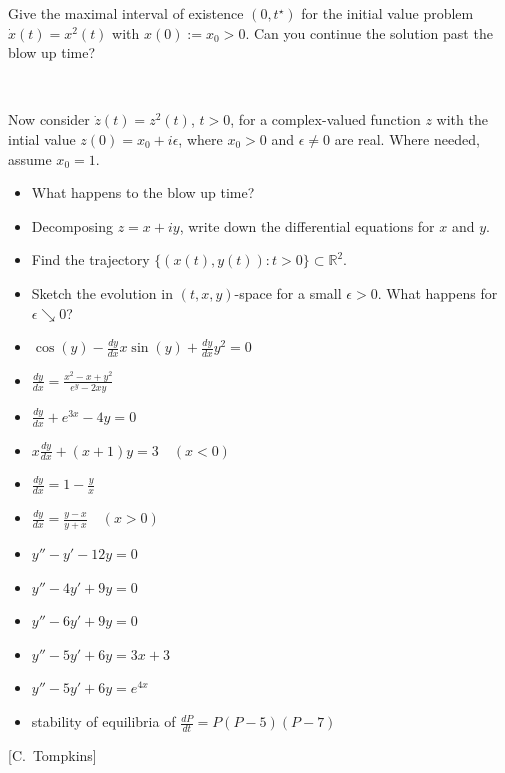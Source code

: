 \documentclass[onepage, 12pt]{beamer}
\begin{document}
\begin{frame}{}{}
    Give the maximal interval of existence $(0, t^\star)$
    for the initial value problem
    $\dot{x}(t) = x^2(t)$
    with
    $x(0) := x_0 > 0$.
    Can you continue the solution past the blow up time?

    {\ }
    
    \pause
    
    Now consider 
    $\dot{z}(t) = z^2(t)$, $t > 0$,
    for a complex-valued function $z$
    with the intial value
    $z(0) = x_0 + i \epsilon$,
    where $x_0 > 0$ and $\epsilon \neq 0$ are real.
    Where needed, assume $x_0 = 1$.

    \begin{itemize}
    \item 
        What happens to the blow up time?
    \item
        Decomposing $z = x + i y$,
        write down the differential equations for $x$ and $y$.
    \item
        Find the trajectory $\{ (x(t), y(t)) : t > 0 \} \subset \mathbb{R}^2$.
    \item
        Sketch the evolution in $(t, x, y)$-space 
        for a small $\epsilon > 0$.
        What happens for $\epsilon \searrow 0$?
    \end{itemize}
\end{frame}



\begin{frame}{}{}
    \begin{itemize}
    \item 
        $\cos(y) - \frac{dy}{dx}x \sin(y) + \frac{dy}{dx}y^2 = 0$
    \item
        $\frac{dy}{dx} = \frac{x^2-x+y^2}{e^y-2xy}$
    \item
        $\frac{dy}{dx} + e^{3x} - 4y = 0$
    \item
        $x \frac{dy}{dx} + (x+1)y = 3 \quad (x<0)$
    \item
        $\frac{dy}{dx} = 1 - \frac{y}{x}$
    \item
        $\frac{dy}{dx} = \frac{y-x}{y+x} \quad (x>0)$
    \item
        $y''-y' -12y = 0$
    \item
        $y'' - 4y' + 9y = 0$
    \item
        $y''-6y'+9y = 0$
    \item
        $y''-5y' +6y = 3x + 3$
    \item 
        $y''-5y' +6y = e^{4x}$
    \item
        stability of equilibria of $\frac{dP}{dt} = P(P-5)(P-7)$
    \end{itemize}
    
    \hfill
    {\footnotesize [C.~Tompkins]}
\end{frame}
\end{document}
